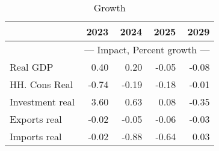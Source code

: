 \documentclass{article}
\begin{document}
\begin{table}[ht]
\caption{Growth}
\begin{tabular}{lrrr|r}
\toprule
 & 2023 & 2024 & 2025 & 2029 \\
\midrule
&\multicolumn{4}{c}{{--- Impact, Percent growth ---}}                     \\
Real GDP & 0.40 & 0.20 & -0.05 & -0.08 \\
HH. Cons Real & -0.74 & -0.19 & -0.18 & -0.01 \\
Investment real & 3.60 & 0.63 & 0.08 & -0.35 \\
Exports real & -0.02 & -0.05 & -0.06 & -0.03 \\
Imports real & -0.02 & -0.88 & -0.64 & 0.03 \\
\bottomrule
\end{tabular}
\end{table}
\end{document}
